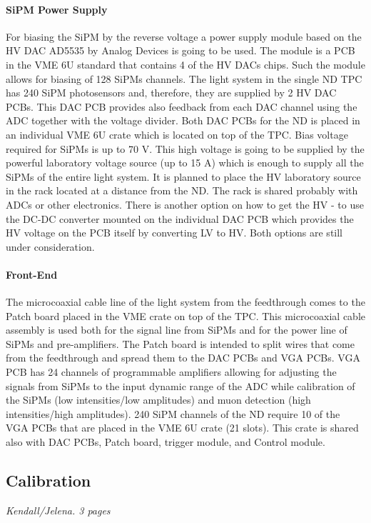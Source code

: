 \paragraph{SiPM Power Supply}

For biasing the SiPM by the reverse voltage a power supply module based on the HV DAC AD5535 by Analog Devices is going to be used. The module is a PCB in the VME 6U standard that contains 4 of the HV DACs chips. Such the module allows for biasing of 128 SiPMs channels. The light system in the single ND TPC has 240 SiPM photosensors and, therefore, they are supplied by 2 HV DAC PCBs. This DAC PCB provides also feedback from each DAC channel using the ADC together with the voltage divider. Both DAC PCBs for the ND is placed in an individual VME 6U crate which is located on top of the TPC. Bias voltage required for SiPMs is up to 70 V. This high voltage is going to be supplied by the powerful laboratory voltage source (up to 15 A) which is enough to supply all the SiPMs of the entire light system. It is planned to place the HV laboratory source in the rack located at a distance from the ND. The rack is shared probably with ADCs or other electronics. There is another option on how to get the HV - to use the DC-DC converter mounted on the individual DAC PCB which provides the HV voltage on the PCB itself by converting LV to HV. Both options are still under consideration.
\paragraph{Front-End}
The microcoaxial cable line of the light system from the feedthrough comes to the Patch board placed in the VME crate on top of the TPC. This microcoaxial cable assembly is used both for the signal line from SiPMs and for the power line of SiPMs and pre-amplifiers. The Patch board is intended to split wires that come from the feedthrough and spread them to the DAC PCBs and VGA PCBs. VGA PCB has 24 channels of programmable amplifiers allowing for adjusting the signals from SiPMs to the input dynamic range of the ADC while calibration of the SiPMs (low intensities/low amplitudes) and muon detection (high intensities/high amplitudes). 240 SiPM channels of the ND require 10 of the VGA PCBs that are placed in the VME 6U crate (21 slots). This crate is shared also with DAC PCBs, Patch board, trigger module, and Control module. 


\subsection{Calibration}
\label{sec:lartpc-des-calib}
{\it Kendall/Jelena. 3 pages}

